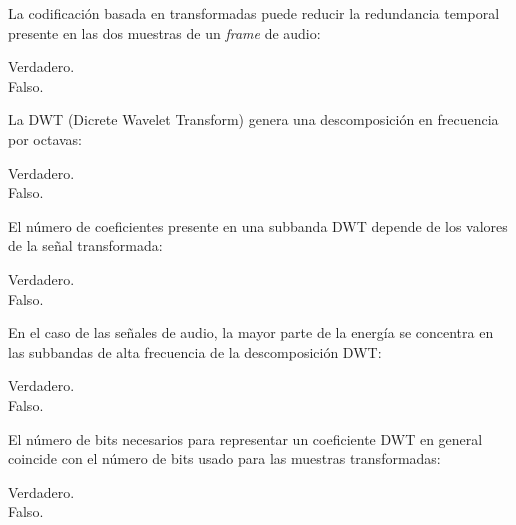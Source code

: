 \documentclass[legalpaper, 12pt, addpoints]{exam}
\begin{document}
\begin{questions}
\vspace{0.10in}

\question La codificación basada en transformadas puede reducir la
redundancia temporal presente en las dos muestras de un \emph{frame}
de audio:

\begin{oneparchoices}
  \choice Verdadero.\\
  \choice Falso.
\end{oneparchoices}
  
\vspace{0.10in}

\question La DWT (Dicrete Wavelet Transform) genera una descomposición
en frecuencia por octavas:

\begin{oneparchoices}
  \choice Verdadero.\\
  \choice Falso.
\end{oneparchoices}
  
\vspace{0.10in}

\question El número de coeficientes presente en una subbanda DWT
depende de los valores de la señal transformada:

\begin{oneparchoices}
  \choice Verdadero.\\
  \choice Falso.
\end{oneparchoices}
  
\vspace{0.10in}

\question En el caso de las señales de audio, la mayor parte de la
energía se concentra en las subbandas de alta frecuencia de la
descomposición DWT:

\begin{oneparchoices}
  \choice Verdadero.\\
  \choice Falso.
\end{oneparchoices}
  
\vspace{0.10in}

\question El número de bits necesarios para representar un coeficiente
DWT en general coincide con el número de bits usado para las muestras
transformadas:

\begin{oneparchoices}
  \choice Verdadero.\\
  \choice Falso.
\end{oneparchoices}
  
\vspace{0.10in}


\end{questions}
\end{document}
